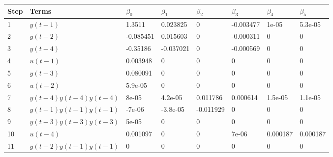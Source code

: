\begin{tabular}{llllllll}
Step & Terms & $\beta_{0}$ & $\beta_{1}$ & $\beta_{2}$ & $\beta_{3}$ & $\beta_{4}$ & $\beta_{5}$ \\ 
\hline 
1 & $y(t-1)$ & 1.3511 & 0.023825 & 0 & -0.003477 & 1e-05 & 5.3e-05 \\ 
2 & $y(t-2)$ & -0.085451 & 0.015603 & 0 & -0.000311 & 0 & 0 \\ 
3 & $y(t-4)$ & -0.35186 & -0.037021 & 0 & -0.000569 & 0 & 0 \\ 
4 & $u(t-1)$ & 0.003948 & 0 & 0 & 0 & 0 & 0 \\ 
5 & $y(t-3)$ & 0.080091 & 0 & 0 & 0 & 0 & 0 \\ 
6 & $u(t-2)$ & 5.9e-05 & 0 & 0 & 0 & 0 & 0 \\ 
7 & $y(t-4)y(t-4)y(t-4)$ & 8e-05 & 4.2e-05 & 0.011786 & 0.000614 & 1.5e-05 & 1.1e-05 \\ 
8 & $y(t-1)y(t-1)y(t-1)$ & -7e-06 & -3.8e-05 & -0.011929 & 0 & 0 & 0 \\ 
9 & $y(t-3)y(t-3)y(t-3)$ & 5e-05 & 0 & 0 & 0 & 0 & 0 \\ 
10 & $u(t-4)$ & 0.001097 & 0 & 0 & 7e-06 & 0.000187 & 0.000187 \\ 
11 & $y(t-2)y(t-1)y(t-1)$ & 0 & 0 & 0 & 0 & 0 & 0 \\ 
\hline 
\end{tabular}